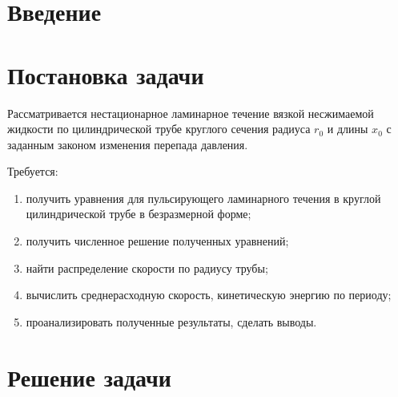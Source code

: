 \documentclass[12pt]{article}
\begin{document}
\newpage
%
%
\section{Введение}
\newpage
\section{Постановка задачи}
Рассматривается нестационарное ламинарное течение вязкой несжимаемой жидкости по цилиндрической трубе круглого сечения радиуса $r_0$ и длины $x_0$ с заданным законом изменения перепада давления.

Требуется:
\begin{enumerate}
\item получить уравнения для пульсирующего ламинарного течения в круглой цилиндрической трубе в безразмерной форме;
\item получить численное решение полученных уравнений;
\item найти распределение скорости по радиусу трубы;
\item вычислить среднерасходную скорость, кинетическую энергию по периоду;
\item проанализировать полученные результаты, сделать выводы.
\end{enumerate}
\newpage
\section{Решение задачи}
\end{document}
